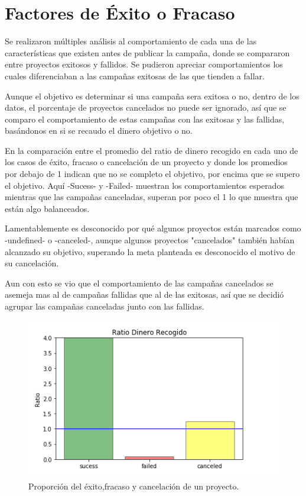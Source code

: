 \documentclass[journal]{IEEEtran}
\begin{document}
\section{Factores de Éxito o Fracaso}
Se realizaron múltiples análisis al comportamiento de cada una de las características que existen antes de publicar la campaña, donde se compararon entre proyectos exitosos y fallidos. Se pudieron apreciar comportamientos los cuales diferenciaban a las campañas exitosas de las que tienden a fallar.

Aunque el objetivo es determinar si una campaña sera exitosa o no, dentro de los datos, el porcentaje de proyectos cancelados no puede ser ignorado, así que se comparo el comportamiento de estas campañas con las exitosas y las fallidas, basándonos en si se recaudo el dinero objetivo o no.

En la comparación entre el promedio del ratio de dinero recogido en cada uno de los casos de éxito, fracaso o cancelación de un proyecto y donde los promedios por debajo de 1 indican que no se completo el objetivo, por encima que se supero el objetivo. Aquí -Sucess- y -Failed- muestran los comportamientos esperados mientras que las campañas canceladas, superan por poco el 1 lo que muestra que están algo balanceados.

Lamentablemente es desconocido por qué algunos proyectos están marcados como -undefined- o -canceled-, aunque algunos proyectos "cancelados" también habían alcanzado su objetivo, superando la meta planteada es desconocido el motivo de su cancelación.

Aun con esto se vio que el comportamiento de las campañas cancelados se asemeja mas al de campañas fallidas que al de las exitosas, así que se decidió agrupar las campañas canceladas junto con las fallidas.

\begin{figure}[H]
    \centering
    \captionsetup{justification=centering}
\includegraphics[width=\linewidth]{Images/RatioDinero.png}
    \caption{Proporción del éxito,fracaso y cancelación de un proyecto. }
\end{figure}
\end{document}
